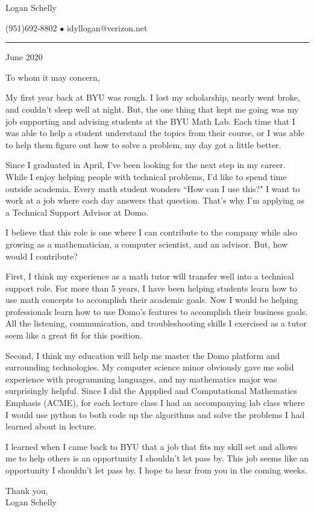 \documentclass{article}
\begin{document}
\begin{center}
{\Large Logan Schelly}

(951)\phantom{-}692-8802
$\bullet$
idyllogan@verizon.net
\end{center}

\hrule
\bigskip
{} June 2020
\bigskip

To whom it may concern,
\bigskip

My first year back at BYU was rough.
I lost my scholarship, nearly went broke, and couldn't sleep well at night.
But, the one thing that kept me going was my job supporting and advising students at the BYU Math Lab.
Each time that I was able to help a student understand the topics from their course,
or I was able to help them figure out how to solve a problem,
my day got a little better.

Since I graduated in April, I've been looking for the next step in my career.
While I enjoy helping people with technical problems, I'd like to spend time outside academia.
Every math student wonders ``How can I use this?"
I want to work at a job where each day answers that question.
That's why I'm applying as a Technical Support Advisor at Domo.

I believe that this role is one where I can contribute to the company
while also growing as a mathematician, a computer scientist, and an advisor.
But, how would I contribute?

First, I think my experience as a math tutor will transfer well into a technical support role.
For more than 5 years, I have been helping students learn how to use math concepts to accomplish their academic goals.
Now I would be helping professionals learn how to use Domo's features to accomplish their business goals.
All the listening, communication, and troubleshooting skills I exercised as a tutor seem like a great fit for this position.

Second, I think my education will help me master the Domo platform and surrounding technologies.
My computer science minor obviously gave me solid experience with programming languages,
and my mathematics major was surprisingly helpful.
Since I did the Appplied and Computational Mathematics Emphasis (ACME),
for each lecture class I had an accompanying lab class
where I would use python to both code up the algorithms and solve the problems I had learned about in lecture.

I learned when I came back to BYU that a job that fits my skill set and allows me to help others is an opportunity I shouldn't let pass by.
This job seems like an opportunity I shouldn't let pass by.
I hope to hear from you in the coming weeks.

\bigskip
\noindent Thank you,\\
\noindent Logan Schelly
  
\end{document}

